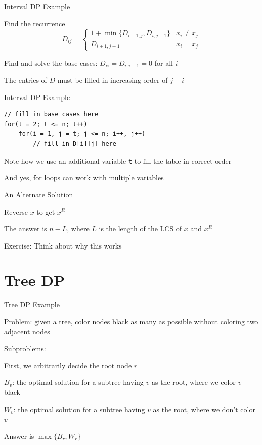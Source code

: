 \documentclass[13pt,onlymath]{beamer}
\begin{document}
\begin{frame}{Interval DP Example}
\BIT
\item Find the recurrence
\[
D_{ij} = \begin{cases}
1 + \min\{D_{i+1, j}, D_{i, j-1}\} & x_i \ne x_j \\
D_{i+1, j-1} & x_i = x_j
\end{cases}
\]
\item Find and solve the base cases: $D_{ii} = D_{i, i-1} = 0$ for all $i$
\vfill
\item The entries of $D$ must be filled in increasing order of $j-i$
\EIT
\end{frame}

\begin{frame}[fragile]{Interval DP Example}
\begin{Verbatim}[xleftmargin=25pt]
// fill in base cases here
for(t = 2; t <= n; t++)
    for(i = 1, j = t; j <= n; i++, j++)
        // fill in D[i][j] here
\end{Verbatim}
\vfill
\BIT
\item Note how we use an additional variable \verb.t. to fill the table in correct order
\item And yes, for loops can work with multiple variables
\EIT
\end{frame}

\begin{frame}{An Alternate Solution}
\BIT
\item Reverse $x$ to get $x^R$
\item The answer is $n-L$, where $L$ is the length of the LCS of $x$ and $x^R$
\vfill
\item Exercise: Think about why this works
\EIT 
\end{frame}


\section{Tree DP}

\begin{frame}{Tree DP Example}
\BIT
\item Problem: given a tree, color nodes black as many as possible without coloring two adjacent nodes
\vfill
\item Subproblems:
\BIT
\item First, we arbitrarily decide the root node $r$
\item $B_v$: the optimal solution for a subtree having $v$ as the root, where we color $v$ black
\item $W_v$: the optimal solution for a subtree having $v$ as the root, where we don't color $v$
\item Answer is $\max\{B_r, W_r\}$
\EIT
\EIT
\end{frame}
\end{document}
